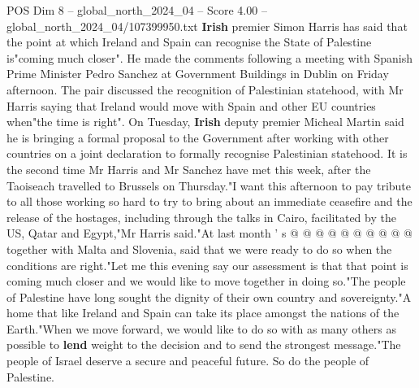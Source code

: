 \begin{textsample}{POS Dim 8 – global\_north\_2024\_04 – Score 4.00 – global\_north\_2024\_04/107399950.txt}  \label{ex:f8_pos_314}
\textbf{Irish} premier Simon Harris has said that the point at which Ireland and Spain can recognise the State of Palestine is"coming much closer".
He made the comments following a meeting with Spanish Prime Minister Pedro Sanchez at Government Buildings in Dublin on Friday afternoon.
The pair discussed the recognition of Palestinian statehood, with Mr Harris saying that Ireland would move with Spain and other EU countries when"the time is right".
On Tuesday, \textbf{Irish} deputy premier Micheal Martin said he is bringing a formal proposal to the Government after working with other countries on a joint declaration to formally recognise Palestinian statehood.
It is the second time Mr Harris and Mr Sanchez have met this week, after the Taoiseach travelled to Brussels on Thursday."I want this afternoon to pay tribute to all those working so hard to try to bring about an immediate ceasefire and the release of the hostages, including through the talks in Cairo, facilitated by the US, Qatar and Egypt,"Mr Harris said."At last month ' s @ @ @ @ @ @ @ @ @ @ together with Malta and Slovenia, said that we were ready to do so when the conditions are right."Let me this evening say our assessment is that that point is coming much closer and we would like to move together in doing so."The people of Palestine have long sought the dignity of their own country and sovereignty."A home that like Ireland and Spain can take its place amongst the nations of the Earth."When we move forward, we would like to do so with as many others as possible to \textbf{lend} weight to the decision and to send the strongest message."The people of Israel deserve a secure and peaceful future.
So do the people of Palestine.

\end{textsample}
